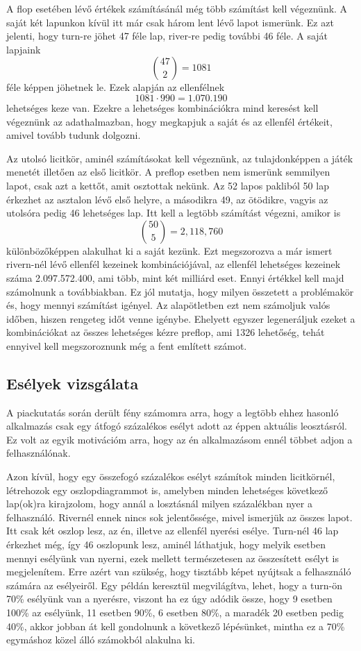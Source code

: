 A flop esetében lévő értékek számításánál még több számítást kell végeznünk. A saját két lapunkon kívül itt már csak három lent lévő lapot ismerünk. Ez azt jelenti, hogy turn-re jöhet 47 féle lap, river-re pedig további 46 féle. A saját lapjaink \[ \binom{47}{2}=1081\] féle képpen jöhetnek le. Ezek alapján az ellenfélnek \[1081\cdot990=1.070.190\] lehetséges keze van. Ezekre a lehetséges kombinációkra mind keresést kell végeznünk az adathalmazban, hogy megkapjuk a saját és az ellenfél értékeit, amivel tovább tudunk dolgozni.

Az utolsó licitkör, aminél számításokat kell végeznünk, az tulajdonképpen a játék menetét illetően az első licitkör. A preflop esetben nem ismerünk semmilyen lapot, csak azt a kettőt, amit osztottak nekünk. Az 52 lapos pakliból 50 lap érkezhet az asztalon lévő első helyre, a másodikra 49, az ötödikre, vagyis az utolsóra pedig 46 lehetséges lap. Itt kell a legtöbb számítást végezni, amikor is \[ \binom{50}{5}=2,118,760\] különbözőképpen alakulhat ki a saját kezünk. Ezt megszorozva a már ismert rivern-nél lévő ellenfél kezeinek kombinációjával, az ellenfél lehetséges kezeinek száma 2.097.572.400, ami több, mint két milliárd eset. Ennyi értékkel kell majd számolnunk a továbbiakban. Ez jól mutatja, hogy milyen összetett a problémakör és, hogy mennyi számítást igényel. Az alapötletben ezt nem számoljuk valós időben, hiszen rengeteg időt venne igénybe. Ehelyett egyszer legeneráljuk ezeket a kombinációkat az összes lehetséges kézre preflop, ami 1326 lehetőség, tehát ennyivel kell megszoroznunk még a fent említett számot.

\subsection{Esélyek vizsgálata}
A piackutatás során derült fény számomra arra, hogy a legtöbb ehhez hasonló alkalmazás csak egy átfogó százalékos esélyt adott az éppen aktuális leosztásról. Ez volt az egyik motivációm arra, hogy az én alkalmazásom ennél többet adjon a felhasználónak.

Azon kívül, hogy egy összefogó százalékos esélyt számítok minden licitkörnél, létrehozok egy oszlopdiagrammot is, amelyben minden lehetséges következő lap(ok)ra kirajzolom, hogy annál a losztásnál milyen százalékban nyer a felhasználó. Rivernél ennek nincs sok jelentőssége, mivel ismerjük az összes lapot. Itt csak két oszlop lesz, az én, illetve az ellenfél nyerési esélye. Turn-nél 46 lap érkezhet még, így 46 oszlopunk lesz, aminél láthatjuk, hogy melyik esetben mennyi esélyünk van nyerni, ezek mellett természetesen az összesített esélyt is megjelenítem. Erre azért van szükség, hogy tisztább képet nyújtsak a felhasználó számára az esélyeiről. Egy példán keresztül megvilágítva, lehet, hogy a turn-ön 70\% esélyünk van a nyerésre, viszont ha ez úgy adódik össze, hogy 9 esetben 100\% az esélyünk, 11 esetben 90\%, 6 esetben 80\%, a maradék 20 esetben pedig 40\%, akkor jobban át kell gondolnunk a következő lépésünket, mintha ez a 70\% egymáshoz közel álló számokból alakulna ki.


